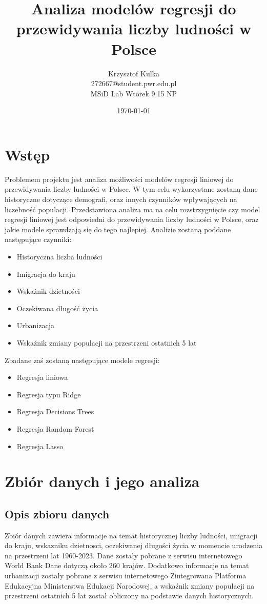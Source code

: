 \documentclass[11pt]{article}
\title{ Analiza modelów regresji do przewidywania liczby ludności w Polsce}
\author{ Krzysztof Kulka
        \\ 272667@student.pwr.edu.pl \\ MSiD Lab Wtorek 9.15 NP }
\date{\today}
\begin{document}
\maketitle	
\pagebreak

\tableofcontents
 \pagebreak


\section{Wstęp}
Problemem projektu jest analiza możliwości modelów regresji liniowej do przewidywania liczby ludności w Polsce. W tym celu wykorzystane zostaną dane historyczne dotyczące demografi, oraz innych czynników wpływających na liczebność populacji.
Przedstawiona analiza ma na celu rozstrzygnięcie czy model regresji liniowej jest odpowiedni do przewidywania liczby ludności w Polsce, oraz jakie modele sprawdzają się do tego najlepiej.
Analizie zostaną poddane następujące czynniki:
\begin{itemize}
\item Historyczna liczba ludności
\item Imigracja do kraju
\item Wskaźnik dzietności
\item Oczekiwana długość życia
\item Urbanizacja
\item Wskaźnik zmiany populacji na przestrzeni ostatnich 5 lat
\end{itemize}
Zbadane zaś zostaną następujące modele regresji:
\begin{itemize}
\item Regresja liniowa
\item Regresja typu Ridge
\item Regresja Decisions Trees
\item Regresja Random Forest
\item Regresja Lasso
\end{itemize}
\section{Zbiór danych i jego analiza}
\subsection*{Opis zbioru danych}
Zbiór danych zawiera informacje na temat historycznej liczby ludności, imigracji do kraju, wskazniku dzietnosci, oczekiwanej długości życia w momencie urodzenia na przestrzeni lat 1960-2023.
Dane zostały pobrane z serwisu internetowego World Bank\cite{wbd} Dane dotyczą około 260 krajów. 
Dodatkowo informacje na temat urbanizacji
zostały pobrane z serwisu internetowego Zintegrowana Platforma Edukacyjna Ministerstwa Edukacji Narodowej\cite{zpe}, a wskaźnik zmiany populacji na przestrzeni ostatnich 5 lat został obliczony na podstawie danych historycznych.
\end{document}
